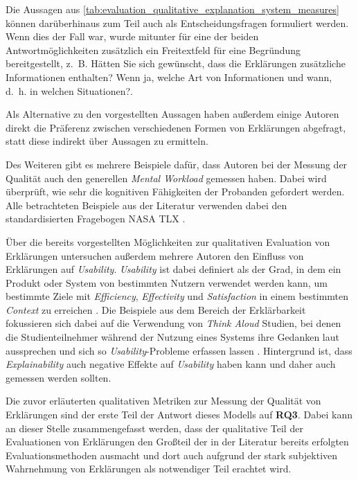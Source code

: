Die Aussagen aus \autoref{tab:evaluation_qualitative_explanation_system_measures} können darüberhinaus zum Teil auch als Entscheidungsfragen formuliert werden. Wenn dies der Fall war, wurde mitunter für eine der beiden Antwortmöglichkeiten zusätzlich ein Freitextfeld für eine Begründung bereitgestellt, z.~B. \glqq Hätten Sie sich gewünscht, dass die Erklärungen zusätzliche Informationen enthalten? Wenn ja, welche Art von Informationen und wann, d.~h. in welchen Situationen?\grqq \cite[übersetzt vgl.][]{riveiro_thats_2021}.

Als Alternative zu den vorgestellten Aussagen haben außerdem einige Autoren direkt die Präferenz zwischen verschiedenen Formen von Erklärungen abgefragt, statt diese indirekt über Aussagen zu ermitteln. \cite{kouki_user_2017, mucha_interfaces_2021, abdulrahman_belief-based_2019, balog_measuring_2020, wiegand_id_2020, stange_effects_2021, kaptein_personalised_2017} 

Des Weiteren gibt es mehrere Beispiele dafür, dass Autoren bei der Messung der Qualität auch den generellen \textit{Mental Workload} gemessen haben. Dabei wird überprüft, wie sehr die kognitiven Fähigkeiten der Probanden gefordert werden. Alle betrachteten Beispiele aus der Literatur verwenden dabei den standardisierten Fragebogen \glqq NASA TLX\grqq{} \cite{wiegand2019drive, wiegand_id_2020,du2019look}.

Über die bereits vorgestellten Möglichkeiten zur qualitativen Evaluation von Erklärungen untersuchen außerdem mehrere Autoren den Einfluss von Erklärungen auf \textit{Usability}. \textit{Usability} ist dabei definiert als der \glqq Grad, in dem ein Produkt oder System von bestimmten Nutzern verwendet werden kann, um bestimmte Ziele mit \textit{Efficiency}, \textit{Effectivity} und \textit{Satisfaction} in einem bestimmten \textit{Context} zu erreichen \grqq{} \cite[übersetzt vgl.][]{international2011iso}. Die Beispiele aus dem Bereich der Erklärbarkeit fokussieren sich dabei auf die Verwendung von \textit{Think Aloud} Studien, bei denen die Studienteilnehmer während der Nutzung eines Systems ihre Gedanken laut aussprechen und sich so \textit{Usability}-Probleme erfassen lassen \cite{wiegand_id_2020, yamada_evaluating_2016}. Hintergrund ist, dass \textit{Explainability} auch negative Effekte auf \textit{Usability} haben kann \cite{chazette_knowledge_nodate} und daher auch gemessen werden sollten.

\bigskip

Die zuvor erläuterten qualitativen Metriken zur Messung der Qualität von Erklärungen sind der erste Teil der Antwort dieses Modells auf \textbf{RQ3}. Dabei kann an dieser Stelle zusammengefasst werden, dass der qualitative Teil der Evaluationen von Erklärungen den Großteil der in der Literatur bereits erfolgten Evaluationsmethoden ausmacht und dort auch aufgrund der stark subjektiven Wahrnehmung von Erklärungen als notwendiger Teil erachtet wird.


